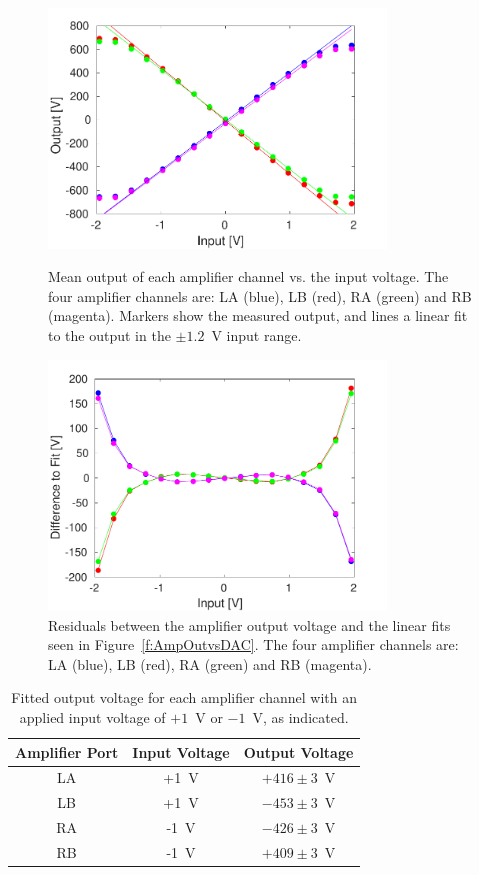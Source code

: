 \begin{figure}
  \centering
  \includegraphics[width=0.8\textwidth]{Figures/commissioning/AmpOutvsDAC}
  \caption{Mean output of each amplifier channel vs. the input voltage. The four amplifier channels are: LA (blue), LB (red), RA (green) and RB (magenta). Markers show the measured output, and lines a linear fit to the output in the \(\pm1.2\)~V input range.}
  \label{f:AmpOutvsDAC}
  \includegraphics[width=0.8\textwidth]{Figures/commissioning/AmpOutvsDAC_residual}
  \caption{Residuals between the amplifier output voltage and the linear fits seen in Figure~\ref{f:AmpOutvsDAC}. The four amplifier channels are: LA (blue), LB (red), RA (green) and RB (magenta). }
  \label{f:AmpOutvsDAC_residual}
\end{figure}

\begin{table}
  \begin{center}
    \begin{tabular}{| c c c |}
	   \hline
       Amplifier Port & Input Voltage & Output Voltage \\ \hline
       LA & +1~V & \(+416\pm3\)~V \\
	   LB & +1~V & \(-453\pm3\)~V \\
	   RA & -1~V & \(-426\pm3\)~V \\
	   RB & -1~V & \(+409\pm3\)~V \\
 	   \hline
    \end{tabular}
    \caption{Fitted output voltage for each amplifier channel with an applied input voltage of \(+1\)~V or \(-1\)~V, as indicated.}
  	\label{t:AmpOutVsDAC}
  \end{center}
\end{table}

